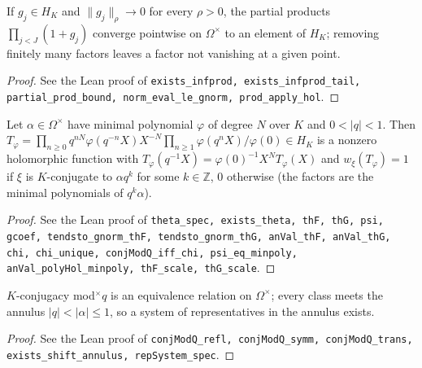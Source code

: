 \begin{proposition}
\label{prop:infinite-products}
\leanok
If $g_j\in H_K$ and $\|g_j\|_\rho\to0$ for every $\rho>0$, the partial products $\prod_{j<J}(1+g_j)$ converge pointwise on $\Omega^\times$ to an element of $H_K$; removing finitely many factors leaves a factor not vanishing at a given point.
\end{proposition}
\begin{proof}
\leanok
See the Lean proof of \texttt{exists\_infprod, exists\_infprod\_tail, partial\_prod\_bound, norm\_eval\_le\_gnorm, prod\_apply\_hol}.
\end{proof}

\begin{proposition}
\label{prop:theta-phi}
\leanok
Let $\alpha\in\Omega^\times$ have minimal polynomial $\varphi$ of degree $N$ over $K$ and $0<|q|<1$. Then $T_\varphi=\prod_{n\ge0}q^{nN}\varphi(q^{-n}X)X^{-N}\prod_{n\ge1}\varphi(q^nX)/\varphi(0)\in H_K$ is a nonzero holomorphic function with $T_\varphi(q^{-1}X)=\varphi(0)^{-1}X^NT_\varphi(X)$ and $w_\xi(T_\varphi)=1$ if $\xi$ is $K$-conjugate to $\alpha q^k$ for some $k\in\mathbb Z$, $0$ otherwise (the factors are the minimal polynomials of $q^k\alpha$).
\end{proposition}
\begin{proof}
\leanok
See the Lean proof of \texttt{theta\_spec, exists\_theta, thF, thG, psi, gcoef, tendsto\_gnorm\_thF, tendsto\_gnorm\_thG, anVal\_thF, anVal\_thG, chi, chi\_unique, conjModQ\_iff\_chi, psi\_eq\_minpoly, anVal\_polyHol\_minpoly, thF\_scale, thG\_scale}.
\end{proof}

\begin{proposition}
\label{prop:conj-classes}
\leanok
$K$-conjugacy mod$^\times q$ is an equivalence relation on $\Omega^\times$; every class meets the annulus $|q|<|\alpha|\le1$, so a system of representatives in the annulus exists.
\end{proposition}
\begin{proof}
\leanok
See the Lean proof of \texttt{conjModQ\_refl, conjModQ\_symm, conjModQ\_trans, exists\_shift\_annulus, repSystem\_spec}.
\end{proof}

